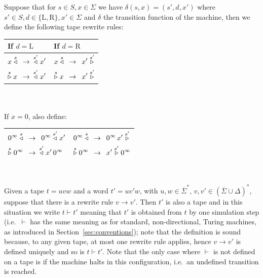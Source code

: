 Suppose that for $s\in S, x\in \Sigma$ we have $\delta(s,x) = (s',d,x')$ where $s'\in S, d \in \{\text{L},\text{R}\}, x' \in \Sigma$ and $\delta$ the transition function of the machine, then we define the following tape rewrite rules:


\begin{table}[h!]
    \centering
    \begin{tabular}{l|l}
        If $d = \text{L}$                               & If $d = \text{R}$ \\
        \hline
        $\begin{aligned}[t]
                 x \stackrel{s}\triangleleft\,\,\, & \to \,\,\, \stackrel{s'}\triangleleft x' \\
                 \stackrel{s}\triangleright x\,\,\, & \to \,\,\, \stackrel{s'}\triangleleft x'
             \end{aligned}$ & $\begin{aligned}[t]
                                   x \stackrel{s}\triangleleft\,\,\, & \to \,\,\, x' \stackrel{s'}\triangleright \\
                                   \stackrel{s}\triangleright x\,\,\, & \to \,\,\, x' \stackrel{s'}\triangleright
                               \end{aligned}$     \\
        \hline
    \end{tabular}\\
    \ \\ If $x=0$, also define: \\
    \begin{tabular}{l|l}
        \hline
        $\begin{aligned}[t]
                 0^\infty \stackrel{s}\triangleleft\,\,\, & \to \,\,\, 0^\infty \stackrel{s'}\triangleleft x'   \\
                 \stackrel{s}\triangleright 0^\infty\,\,\, & \to \,\,\, \stackrel{s'}\triangleleft x'\, 0^\infty
             \end{aligned}$ & $\begin{aligned}[t]
                                   0^\infty \stackrel{s}\triangleleft\,\,\, & \to \,\,\, 0^\infty \, x' \stackrel{s'}\triangleright \\
                                   \stackrel{s}\triangleright 0^\infty\,\,\, & \to \,\,\, x' \stackrel{s'}\triangleright 0^\infty
                               \end{aligned}$ \\
        \hline
    \end{tabular}\\
\end{table}

Given a tape $t=uvw$ and a word $t'=uv'w$, with $u,w\in \overline{\Sigma}^*$, $v,v' \in ( \overline \Sigma \cup \Delta)^*$, suppose that there is a rewrite rule $v \to v'$. Then $t'$ is also a tape and in this situation we write $t \vdash t'$ meaning that $t'$ is obtained from $t$ by one simulation step (i.e.\ $\vdash$ has the same meaning as for standard, non-directional, Turing machines, as introduced in Section~\ref{sec:conventions}); note that the definition is sound because, to any given tape, at most one rewrite rule applies, hence $v \to v'$ is defined uniquely and so is $t \vdash t'$. Note that the only case where $\vdash$ is not defined on a tape is if the machine halts in this configuration, i.e.\ an undefined transition is reached.

